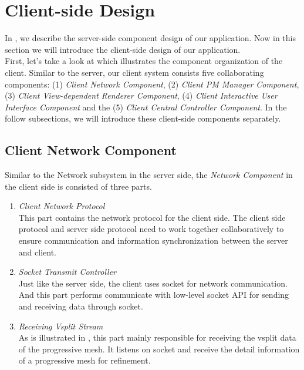 \section{Client-side Design}
\label{section:clientdesign}

In , we describe the server-side component design of our application. Now in this section we will introduce the client-side design of our application. \\

First, let's take a look at  which illustrates the component organization of the client. Similar to the server, our client system consists five collaborating components: (1) \emph{Client Network Component}, (2) \emph{Client PM Manager Component}, (3) \emph{Client View-dependent Renderer Component}, (4) \emph{Client Interactive User Interface Component} and the (5) \emph{Client Central Controller Component}. In the follow subsections, we will introduce these client-side components separately.

\subsection{Client Network Component}
\label{section:clientnetcom}

Similar to the Network subsystem in the server side, the \emph{Network Component} in the client side is consisted of three parts. 
\begin{enumerate}
\item
\emph{Client Network Protocol}\\
This part contains the network protocol for the client side. The client side protocol and server side protocol need to work together collaboratively to ensure communication and information synchronization between the server and client. 
\item
\emph{Socket Transmit Controller}\\
Just like the server side, the client uses socket for network communication. And this part performs communicate with low-level socket API for sending and receiving data through socket. 
\item
\emph{Receiving Vsplit Stream}\\
As is illustrated in , this part mainly responsible for receiving the vsplit data of the progressive mesh. It listens on socket and receive the detail information of a progressive mesh for refinement.
\end{enumerate}

